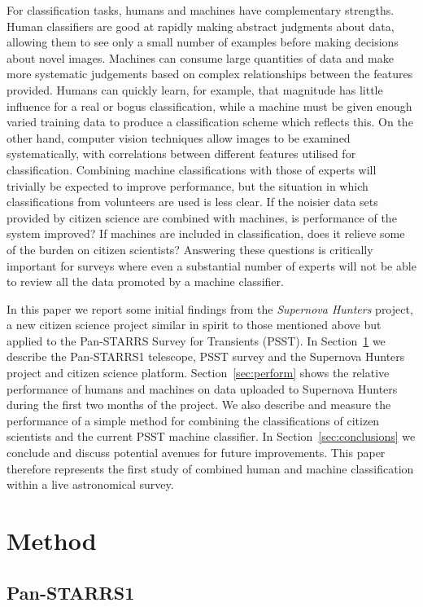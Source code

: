 \documentclass[a4paper,fleqn,usenatbib]{mnras}
\begin{document}
For classification tasks, humans and machines have complementary strengths. Human classifiers are good at rapidly making abstract judgments about data, allowing them to see only a small number of examples before making decisions about novel images.  Machines can consume large quantities of data and make more systematic judgements based on complex relationships between the features provided.  Humans can quickly learn, for example, that magnitude has little influence for a real or bogus classification, while a machine must be given enough varied training data to produce a classification scheme which reflects this. On the other hand, computer vision techniques allow images to be examined systematically, with correlations between different features utilised for classification. Combining machine classifications with those of experts will trivially be expected to improve performance, but the situation in which classifications from volunteers are used is less clear. If the noisier data sets provided by citizen science are combined with machines, is performance of the system improved? If machines are included in classification, does it relieve some of the burden on citizen scientists? Answering these questions is critically important for surveys where even a substantial number of experts will not be able to review all the data promoted by a machine classifier. 

In this paper we report some initial findings from the \textit{Supernova Hunters} project, a new citizen science project similar in spirit to those mentioned above but applied to the Pan-STARRS Survey for Transients (PSST).  In Section~\ref{sec:method} we describe the Pan-STARRS1 telescope, PSST survey and the Supernova Hunters project and citizen science platform.  Section~\ref{sec:perform} shows the relative performance of humans and machines on data uploaded to Supernova Hunters during the first two months of the project.  We also describe and measure the performance of a simple method for combining the classifications of citizen scientists and the current PSST machine classifier.  In Section~\ref{sec:conclusions} we conclude and discuss potential avenues for future improvements. This paper therefore represents the first study of combined human and machine classification within a live astronomical survey. 


\section{Method}
\label{sec:method}
\subsection{Pan-STARRS1}
\label{sec:ps1}
\end{document}
